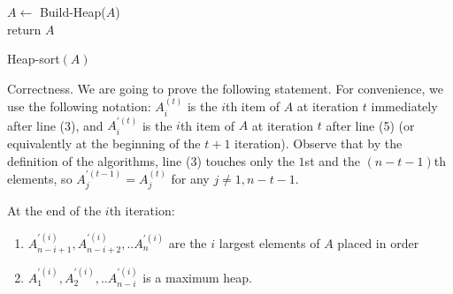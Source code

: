 \begin{algorithm}
    $A \leftarrow$ Build-Heap($A$)\\
	  return $A$
\caption{Heap-sort$(A)$}
  \label{alg:heapsort} 
  \end{algorithm}
  Correctness. We are going to prove the following statement. For convenience, we use the following notation: $A^{(t)}_{i}$ is the $i$th item of $A$ at iteration $t$ immediately after line (3), and $A^{\prime (t)}_{i}$ is the $i$th item of $A$ at iteration $t$ after line (5) (or equivalently at the beginning of the $t+1$ iteration). Observe that by the definition of the algorithms, line (3) touches only the $1$st and the $(n-t-1)$th elements, so $A^{\prime (t-1)}_{j} = A^{(t)}_{j}$ for any $j \neq 1, n-t-1$.
  \begin{claim}   
At the end of the $i$th iteration:
\begin{enumerate}
  \item $A^{\prime(i)}_{n-i+1},A^{\prime(i)}_{n-i+2},..A^{\prime(i)}_{n}$ are the $i$ largest elements of $A$ placed in order
    \item $A^{\prime(i)}_{1},A^{\prime(i)}_{2},..A^{\prime(i)}_{n-i}$ is a maximum heap.
\end{enumerate}
  \end{claim}
